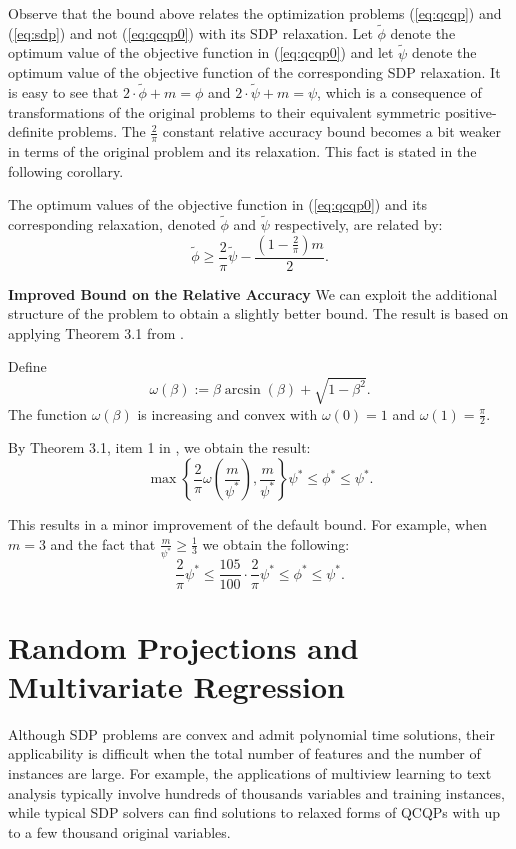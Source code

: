 Observe that the bound above relates the optimization problems (\ref{eq:qcqp}) and (\ref{eq:sdp})
and not (\ref{eq:qcqp0}) with its SDP relaxation. Let $\widetilde{\phi}$ denote the optimum value
of the objective function in (\ref{eq:qcqp0}) and let $\widetilde{\psi}$ denote the optimum value
of the objective function of the corresponding SDP relaxation. It is easy to see that
$2 \cdot \widetilde{\phi} + m = \phi$ and $2 \cdot \widetilde{\psi} + m = \psi$, which is a
consequence of transformations of the original problems to their equivalent symmetric
positive-definite problems. The $\frac{2}{\pi}$ constant relative accuracy bound becomes a bit
weaker in terms of the original problem and its relaxation. This fact is stated in the following corollary.
\begin{corollary}
The optimum values of the objective function in (\ref{eq:qcqp0}) and its corresponding relaxation,
denoted $\widetilde{\phi}$ and $\widetilde{\psi}$ respectively, are related by:
$$\widetilde{\phi} \geq \frac{2}{\pi} \widetilde{\psi} - \frac{(1 - \frac{2}{\pi}) m}{2}.$$
\end{corollary}

\noindent\textbf{Improved Bound on the Relative Accuracy}
We can exploit the additional structure of the problem to obtain a slightly better bound.
The result is based on applying Theorem 3.1 from \cite{Nesterov98globalquadratic}.

Define
$$\omega\left(\beta\right) := \beta \arcsin\left(\beta\right) + \sqrt{1 - \beta^2}.$$
The function $\omega\left(\beta\right)$ is increasing and convex with
$\omega\left(0\right) = 1$ and $\omega\left(1\right) = \frac{\pi}{2}$.

By Theorem 3.1, item 1 in \cite{Nesterov98globalquadratic}, we obtain the result:
$$ \max\left\{\frac{2}{\pi}\omega\left(\frac{m}{\psi^*}\right), \frac{m}{\psi^*} \right\}   \psi^* \leq \phi^* \leq \psi^*.$$

This results in a minor improvement of the default bound. For example, when $m = 3$ and
the fact that $\frac{m}{\psi^*} \geq \frac{1}{3}$ we obtain the following:
$$ \frac{2}{\pi} \psi^* \leq \frac{105}{100}  \cdot \frac{2}{\pi} \psi^* \leq \phi^* \leq \psi^*.$$


\section{Random Projections and Multivariate Regression}\label{chap:relaxations:practical}

Although SDP problems are convex and admit polynomial time solutions, their
applicability is difficult when the total number of features and the number of
instances are large. For example, the applications of multiview
learning to text analysis typically involve hundreds of thousands variables
and training instances, while typical SDP solvers can find solutions to relaxed forms of
QCQPs with up to a few thousand original variables.

